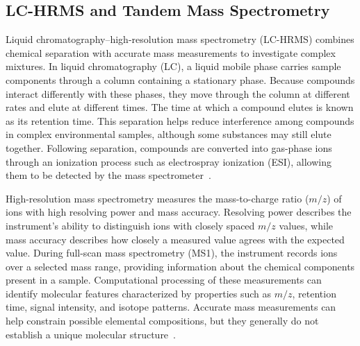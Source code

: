     \subsection{LC-HRMS and Tandem Mass Spectrometry}\label{subsec:lc-hrms-msms}


       Liquid chromatography--high-resolution mass spectrometry (LC-HRMS) combines chemical separation with accurate mass measurements to investigate complex mixtures. In liquid chromatography (LC), a liquid mobile phase carries sample components through a column containing a stationary phase. Because compounds interact differently with these phases, they move through the column at different rates and elute at different times. The time at which a compound elutes is known as its retention time. This separation helps reduce interference among compounds in complex environmental samples, although some substances may still elute together. Following separation, compounds are converted into gas-phase ions through an ionization process such as electrospray ionization (ESI), allowing them to be detected by the mass spectrometer~\cite{Manz2023,Kind2018}.

        High-resolution mass spectrometry measures the mass-to-charge ratio ($m/z$) of ions with high resolving power and mass accuracy. Resolving power describes the instrument's ability to distinguish ions with closely spaced $m/z$ values, while mass accuracy describes how closely a measured value agrees with the expected value. During full-scan mass spectrometry (MS1), the instrument records ions over a selected mass range, providing information about the chemical components present in a sample. Computational processing of these measurements can identify molecular features characterized by properties such as $m/z$, retention time, signal intensity, and isotope patterns. Accurate mass measurements can help constrain possible elemental compositions, but they generally do not establish a unique molecular structure~\cite{Kind2018,Manz2023}.

